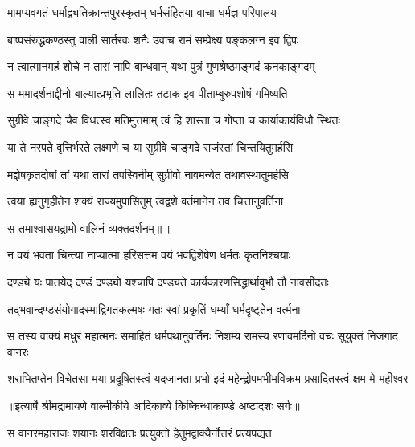 \twolineshloka
{मामप्यवगतं धर्माद्व्यतिक्रान्तपुरस्कृतम्}
{धर्मसंहितया वाचा धर्मज्ञ परिपालय} %

\twolineshloka
{बाष्पसंरुद्धकण्ठस्तु वाली सार्तरवः शनैः}
{उवाच रामं सम्प्रेक्ष्य पङ्कलग्न इव द्विपः} %

\twolineshloka
{न त्वात्मानमहं शोचे न तारां नापि बान्धवान्}
{यथा पुत्रं गुणश्रेष्ठमङ्गदं कनकाङ्गदम्} %

\twolineshloka
{स ममादर्शनाद्दीनो बाल्यात्प्रभृति लालितः}
{तटाक इव पीताम्बुरुपशोषं गमिष्यति} %

\twolineshloka
{सुग्रीवे चाङ्गदे चैव विधत्स्व मतिमुत्तमाम्}
{त्वं हि शास्ता च गोप्ता च कार्याकार्यविधौ स्थितः} %

\twolineshloka
{या ते नरपते वृत्तिर्भरते लक्ष्मणे च या}
{सुग्रीवे चाङ्गदे राजंस्तां चिन्तयितुमर्हसि} %

\twolineshloka
{मद्दोषकृतदोषां तां यथा तारां तपस्विनीम्}
{सुग्रीवो नावमन्येत तथावस्थातुमर्हसि} %

\twolineshloka
{त्वया ह्यनुगृहीतेन शक्यं राज्यमुपासितुम्}
{त्वद्वशे वर्तमानेन तव चित्तानुवर्तिना} %

{स तमाश्वासयद्रामो वालिनं व्यक्तदर्शनम्॥॥} %

\addtocounter{shlokacount}{1}

\twolineshloka
{न वयं भवता चिन्त्या नाप्यात्मा हरिसत्तम}
{वयं भवद्विशेषेण धर्मतः कृतनिश्चयाः} %

\twolineshloka
{दण्ड्ये यः पातयेद् दण्डं दण्ड्यो यश्चापि दण्ड्यते}
{कार्यकारणसिद्धार्थावुभौ तौ नावसीदतः} %

\twolineshloka
{तद्भवान्दण्डसंयोगादस्माद्विगतकल्मषः}
{गतः स्वां प्रकृतिं धर्म्यां धर्मदृष्ट्तेन वर्त्मना} %

\fourlineindentedshloka
{स तस्य वाक्यं मधुरं महात्मनः}
{समाहितं धर्मपथानुवर्तिनः}
{निशम्य रामस्य रणावमर्दिनो}
{वचः सुयुक्तं निजगाद वानरः} %

\fourlineindentedshloka
{शराभितप्तेन विचेतसा मया}
{प्रदूषितस्त्वं यदजानता प्रभो}
{इदं महेन्द्रोपमभीमविक्रम}
{प्रसादितस्त्वं क्षम मे महीश्वर} %


{॥इत्यार्षे श्रीमद्रामायणे वाल्मीकीये आदिकाव्ये किष्किन्धाकाण्डे अष्टादशः सर्गः॥}


\twolineshloka
{स वानरमहाराजः शयानः शरविक्षतः}
{प्रत्युक्तो हेतुमद्वाक्यैर्नोत्तरं प्रत्यपद्यत} %

